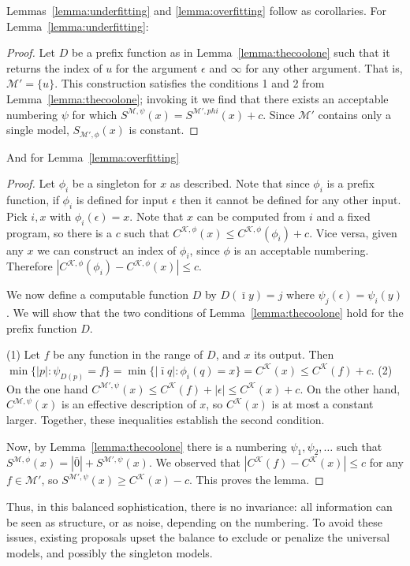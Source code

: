 \documentclass{style/llncs}
\newcommand{\M}{\mathscr M}
\newcommand{\K}{\mathscr K}
\newcommand{\s}{S}
\begin{document}
Lemmas~\ref{lemma:underfitting} and \ref{lemma:overfitting} follow as corollaries. For Lemma~\ref{lemma:underfitting}:
\begin{proof}
Let $D$ be a prefix function as in Lemma~\ref{lemma:thecoolone} such that it returns the index of $u$ for the argument $\epsilon$ and $\infty$ for any other argument. That is, $\M' = \{u\}$. This construction satisfies the conditions 1 and 2 from Lemma~\ref{lemma:thecoolone}; invoking it we find that there exists an acceptable numbering $\psi$ for which $\s^{\M,\psi}(x) = \s^{\M', phi}(x) + c$. Since $\M'$ contains only a single model, $\s_{\M',\phi}(x)$ is constant.
\end{proof}

And for Lemma~\ref{lemma:overfitting}

\begin{proof}
Let $\phi_i$ be a singleton for $x$ as described. Note that since $\phi_i$ is a prefix function, if $\phi_i$ is defined for input $\epsilon$ then it cannot be defined for any other input. Pick $i,x$ with $\phi_i(\epsilon)=x$. Note that $x$ can be computed from $i$ and a fixed program, so there is a $c$ such that $C^{\K, \phi}(x)\le C^{\K, \phi}(\phi_i)+c$. Vice versa, given any $x$ we can construct an index of $\phi_i$, since $\phi$ is an acceptable numbering. Therefore $|C^{\K,\phi}(\phi_i)-C^{\K, \phi}(x)|\le c$.

We now define a computable function $D$ by $D(\bar\imath y)=j$ where $\psi_j(\epsilon) = \psi_i(y)$.  We will show that the two conditions of Lemma~\ref{lemma:thecoolone} hold for the prefix function $D$.

(1) Let $f$ be any function in the range of $D$, and $x$ its output. Then $\min\{|p|:\psi_{D(p)}=f\}=\min\{|\bar\imath q|:\phi_i(q)=x\}=C^{\K}(x) \le C^{\K}(f)+c$. (2) On the one hand $C^{\M',\psi}(x)\le C^\K(f)+|\epsilon|\le C^\K(x)+c$. On the other hand, $C^{\M,\psi}(x)$ is an effective description of $x$, so $C^{\K}(x)$ is at most a constant larger. Together, these inequalities establish the second condition.

Now, by Lemma~\ref{lemma:thecoolone} there is a numbering $\psi_1,\psi_2,\ldots$ such that $\s^{\M,\phi}(x)=|\bar 0|+S^{\M',\psi}(x)$. We observed that $|C^{\K}(f)-C^{\K}(x)|\le c$ for any $f\in\M'$, so $\s^{\M',\psi}(x)\ge C^{\K}(x)-c$. This proves the lemma.
\end{proof}

\noindent Thus, in this balanced sophistication, there is no invariance: all information can be seen as structure, or as noise, depending on the numbering. To avoid these issues, existing proposals upset the balance to exclude or penalize the universal models, and possibly the singleton models.
 
\end{document}
